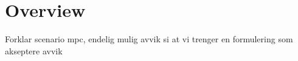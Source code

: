 \section{Overview}
    Forklar scenario mpc, endelig mulig avvik
    si at vi trenger en formulering som akseptere avvik